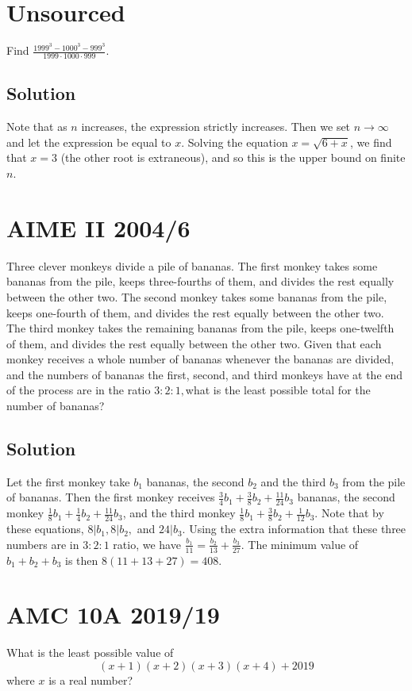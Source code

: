 \documentclass[blue,onecol]{shooting}
\begin{document}
\section{Unsourced}

Find $\frac{1999^3-1000^3-999^3}{1999\cdot 1000\cdot 999}.$

\subsection{Solution}

Note that as $n$ increases, the expression strictly increases. Then we set $n\to\infty$ and let the expression be equal to $x$. Solving the equation $x=\sqrt{6+x}$, we find that $x=3$ (the other root is extraneous), and so this is the upper bound on finite $n$. 

\section{AIME II 2004/6}
Three clever monkeys divide a pile of bananas. The first monkey takes some bananas from the pile, keeps three-fourths of them, and divides the rest equally between the other two. The second monkey takes some bananas from the pile, keeps one-fourth of them, and divides the rest equally between the other two. The third monkey takes the remaining bananas from the pile, keeps one-twelfth of them, and divides the rest equally between the other two. Given that each monkey receives a whole number of bananas whenever the bananas are divided, and the numbers of bananas the first, second, and third monkeys have at the end of the process are in the ratio $3: 2: 1,$what is the least possible total for the number of bananas?
\subsection{Solution}
Let the first monkey take $b_1$ bananas, the second $b_2$ and the third $b_3$ from the pile of bananas. Then the first monkey receives $\frac34b_1+\frac38b_2+\frac{11}{24}b_3$ bananas, the second monkey $\frac 18 b_1+\frac14b_2+\frac{11}{24}b_3$, and the third monkey $\frac18b_1+\frac38b_2+\frac1{12}b_3$. Note that by these equations, $8|b_1,8|b_2,$ and $24|b_3$. Using the extra information that these three numbers are in $3:2:1$ ratio, we have $\frac{b_1}{11}=\frac{b_2}{13}+\frac{b_3}{27}$. The minimum value of $b_1+b_2+b_3$ is then $8(11+13+27)=408$. 

\section{AMC 10A 2019/19}
What is the least possible value of\[(x+1)(x+2)(x+3)(x+4)+2019\]where $x$ is a real number?
\end{document}

